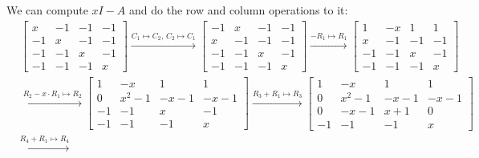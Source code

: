 \begin{answer}
    We can compute $xI - A$ and do the row and column operations to it:
    \begin{equation}
        \begin{aligned}
            &\left[
            \begin{matrix}
            x & -1 & -1 & -1 \\
            -1 & x & -1 & -1 \\
            -1 & -1 & x & -1 \\
            -1 & -1 & -1 & x
            \end{matrix}
            \right] \xrightarrow{C_1 \mapsto C_2,\, C_2 \mapsto C_1}
            \left[
            \begin{matrix}
            -1 & x & -1 & -1 \\
            x & -1 & -1 & -1 \\
            -1 & -1 & x & -1 \\
            -1 & -1 & -1 & x
            \end{matrix}
            \right] \xrightarrow{-R_1 \mapsto R_1}
            \left[
            \begin{matrix}
            1 & -x & 1 & 1 \\
            x & -1 & -1 & -1 \\
            -1 & -1 & x & -1 \\
            -1 & -1 & -1 & x
            \end{matrix}
            \right]\\
            &\xrightarrow{R_2-x\cdot R_1 \mapsto R_2}
            \left[
            \begin{matrix}
            1 & -x & 1 & 1 \\
            0 & x^2-1 & -x-1 & -x-1 \\
            -1 & -1 & x & -1 \\
            -1 & -1 & -1 & x
            \end{matrix}
            \right]\xrightarrow{R_3+R_1 \mapsto R_3}
            \left[
            \begin{matrix}
            1 & -x & 1 & 1 \\
            0 & x^2-1 & -x-1 & -x-1 \\
            0 & -x-1 & x+1 & 0 \\
            -1 & -1 & -1 & x
            \end{matrix}
            \right]\\
            &\xrightarrow{R_4+R_1 \mapsto R_4}

\end{aligned}
\end{equation}
\end{answer}
